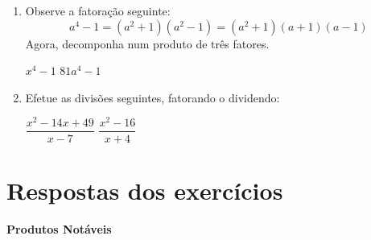 \begin{enumerate}
	\item Observe a fatoração seguinte:
	\[
	a^4 - 1 = (a^2 + 1)(a^2 - 1) = (a^2 + 1)(a + 1)(a - 1)
	\]
	Agora, decomponha num produto de três fatores.
	\begin{tasks}
		\task $x^4 - 1$
		\task $81a^4 - 1$
	\end{tasks}
	
	\item Efetue as divisões seguintes, fatorando o dividendo:
	\begin{tasks}
		\task $\dfrac{x^2-14x+49}{x-7}$
		\task $\dfrac{x^2 - 16}{x + 4}$
	\end{tasks}
\end{enumerate}
	
	\section{Respostas dos exercícios}
    \noindent
	\textbf{Produtos Notáveis}

